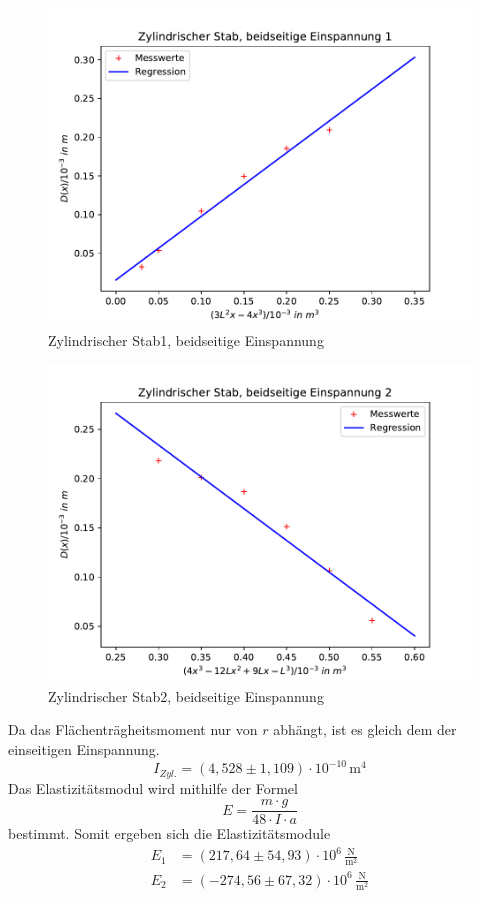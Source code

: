 \begin{figure}
  \centering
  \includegraphics[width=\textwidth]{plot31.pdf}
  \caption{Zylindrischer Stab1, beidseitige Einspannung}
\end{figure}
\begin{figure}
  \centering
  \includegraphics[width=\textwidth]{plot32.pdf}
  \caption{Zylindrischer Stab2, beidseitige Einspannung}
\end{figure}
Da das Flächenträgheitsmoment nur von $r$ abhängt, ist es gleich dem der einseitigen Einspannung.
\begin{equation*}
  I_{Zyl.} = (4,528 \pm 1,109) \cdot 10^{-10}\, \mathrm{m^4}
\end{equation*}
Das Elastizitätsmodul wird mithilfe der Formel
\begin{equation*}
  E = \frac{m \cdot g}{48 \cdot I \cdot a}
\end{equation*}
bestimmt.
Somit ergeben sich die Elastizitätsmodule
\begin{align*}
  E_1 &= (217,64 \pm 54,93) \cdot 10^6 \, \mathrm{\frac{N}{m^2}} \\
  E_2 &= (-274,56 \pm 67,32) \cdot 10^6\, \mathrm{\frac{N}{m^2}}
\end{align*}
\newpage
